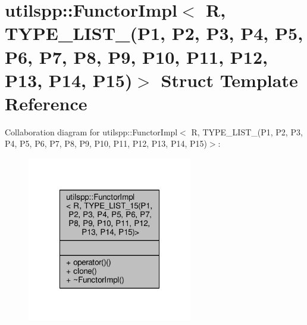 \hypertarget{structutilspp_1_1FunctorImpl_3_01R_00_01TYPE__LIST__15_07P1_00_01P2_00_01P3_00_01P4_00_01P5_00_03f6bfb72f2977866a35a5dbc6e440ab4}{\section{utilspp\-:\-:Functor\-Impl$<$ R, T\-Y\-P\-E\-\_\-\-L\-I\-S\-T\-\_(P1, P2, P3, P4, P5, P6, P7, P8, P9, P10, P11, P12, P13, P14, P15)$>$ Struct Template Reference}
\label{structutilspp_1_1FunctorImpl_3_01R_00_01TYPE__LIST__15_07P1_00_01P2_00_01P3_00_01P4_00_01P5_00_03f6bfb72f2977866a35a5dbc6e440ab4}
}


Collaboration diagram for utilspp\-:\-:Functor\-Impl$<$ R, T\-Y\-P\-E\-\_\-\-L\-I\-S\-T\-\_(P1, P2, P3, P4, P5, P6, P7, P8, P9, P10, P11, P12, P13, P14, P15)$>$\-:\nopagebreak
\begin{figure}[H]
\begin{center}
\leavevmode
\includegraphics[width=204pt]{structutilspp_1_1FunctorImpl_3_01R_00_01TYPE__LIST__15_07P1_00_01P2_00_01P3_00_01P4_00_01P5_00_08a89af694afbd983ff661781d76f97f6}
\end{center}
\end{figure}
